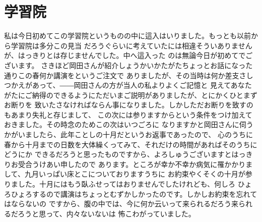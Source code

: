 \section{学習院}
  私は今日初めてこの学習院というものの中に這入はいりました。もっとも以前から学習院は多分この見当
  だろうぐらいに考えていたには相違そういありませんが、はっきりとは存じませんでした。中へ這入った
  のは無論今日が初めてでございます。
  さきほど岡田さんが紹介しょうかいかたがたちょっとお話になった通りこの春何か講演をというご注文で
  ありましたが、その当時は何か差支さしつかえがあって、――岡田さんの方が当人の私よりよくご記憶と
  見えてあなたがたにご納得のできるようにただいまご説明がありましたが、とにかくひとまずお断りを
  致いたさなければならん事になりました。しかしただお断りを致すのもあまり失礼と存じまして、
  この次には参りますからという条件をつけ加えておきました。その時念のためこの次はいつごろに
  なりますかと岡田さんに伺うかがいましたら、此年ことしの十月だというお返事であったので、
  心のうちに春から十月までの日数を大体繰くってみて、それだけの時間があればそのうちにどうにか
  できるだろうと思ったものですから、よろしゅうございますとはっきりお受合うけあい申したので
  あります。ところが幸か不幸か病気に罹かかりまして、九月いっぱい床とこについておりますうちに
  お約束やくそくの十月が参りました。十月にはもう臥ふせってはおりませんでしたけれども、何しろ
  ひょろひょろするので講演はちょっとむずかしかったのです。しかしお約束を忘れてはならないの
  ですから、腹の中では、今に何か云いって来られるだろう来られるだろうと思って、内々ないないは
  怖こわがっていました。


